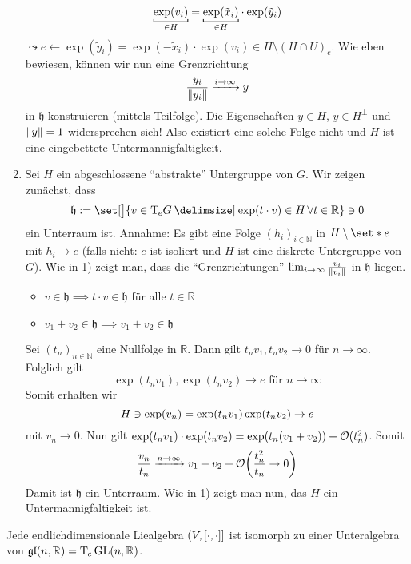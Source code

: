 \begin{beweis}
\begin{enumerate}[1)]
		\[
			\Underbracket{\exp(v_i)}{\in H} = \Underbracket{\exp(\tilde{x}_i)}{\in H} \cdot \exp(\tilde{y}_i)
		\]
		$\leadsto e \leftarrow  \exp(\tilde{y}_i) = \exp(- \tilde{x}_i) \cdot \exp(v_i) \in H \setminus (H \cap U)_e$.
		Wie eben bewiesen, können wir nun eine Grenzrichtung 
		\[
			\frac{y_i}{\norm*{y_i}} \grenzw{i \to \infty}  y
		\]
		in $\mathfrak{h}$ konstruieren (mittels Teilfolge).
		Die Eigenschaften $y \in H$, $y \in H^\bot$ und $\norm*{y}=1$ widersprechen sich!
		Also existiert eine solche Folge nicht und $H$ ist eine eingebettete Untermannigfaltigkeit.
		\item Sei $H$ ein abgeschlossene \enquote{abstrakte} Untergruppe von $G$.
		Wir zeigen zunächst, dass 
		\[
			\mathfrak{h} := \set[\big]{v \in \Tmap_e G \given \exp(t \cdot v) \in H \,\forall t \in \mathbb{R}} \ni 0
		\]
		ein Unterraum ist.
		Annahme: Es gibt eine Folge $(h_i)_{i \in \mathbb{N}}$ in $H \setminus \set*{e}$ mit $h_i \to e$ (falls nicht: $e$ ist isoliert und $H$ ist eine diskrete Untergruppe von $G$).
		Wie in 1) zeigt man, dass die \enquote{Grenzrichtungen} $\lim_{i \to \infty} \frac{v_i}{\norm*{v_i}}$ in $\mathfrak{h}$ liegen.
		\begin{itemize}
			\item $v \in \mathfrak{h} \implies t \cdot v \in \mathfrak{h}$ für alle $t \in \mathbb{R}$
			\item $v_1 + v_2 \in \mathfrak{h} \implies v_1 + v_2 \in \mathfrak{h}$
		\end{itemize}
		Sei $(t_n)_{n \in \mathbb{N}}$ eine Nullfolge in $\mathbb{R}$.
		Dann gilt $t_n v_1, t_n v_2 \to 0$ für $n \to \infty$.
		Folglich gilt 
		\[
			\exp(t_n v_1), \exp(t_n v_2) \to e \text{ für }  n \to \infty
		\]
		Somit erhalten wir
		\[
			H \ni \exp(v_n) = \exp \enbrace*{t_n v_1} \exp(t_n v_2) \to e
		\]
		mit $v_n \to 0$.
		Nun gilt $\exp(t_n v_1) \cdot \exp(t_n v_2) = \exp \enbrace*{t_n(v_1 + v_2)} + \mathcal{O}(t_n^2)$.
		Somit
		\[
			\frac{v_n}{t_n} \grenzw{n \to \infty} v_1 +v_2 + \mathcal{O} \enbrace*{\frac{t_n^2}{t_n} \to 0 } 
		\]
		Damit ist $\mathfrak{h}$ ein Unterraum.
		Wie in 1) zeigt man nun, das $H$ ein Untermannigfaltigkeit ist.\qedhere
	\end{enumerate}
\end{beweis}

\begin{satz}[name={Ado},label=satz:1211]
	Jede endlichdimensionale Liealgebra $(V,\benbrace*{\cdot,\cdot }]$ ist isomorph zu einer Unteralgebra von $\mathfrak{gl}(n,\mathbb{R}) = \Tmap_e \GL(n,\mathbb{R})$.
\end{satz}

